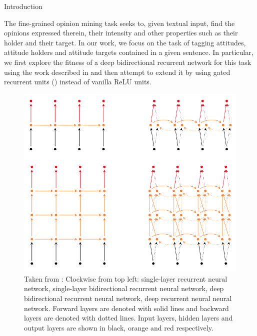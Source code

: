 \documentclass[final]{beamer}
\newlength{\onecolwid}
\begin{document}
\begin{frame}[t]
\begin{columns}[t]
\begin{column}{\onecolwid}
\begin{block}{Introduction}

The fine-grained opinion mining task seeks to, given textual input, find the opinions expressed therein, their intensity and other properties such as their holder and their target. In our work, we focus on the task of tagging attitudes, attitude holders and attitude targets contained in a given sentence. In particular, we first explore the fitness of a deep bidirectional recurrent network for this task using the work described in \cite{irsoy2014opinion} and then attempt to extend it by using gated recurrent units (\cite{DBLP:journals/corr/ChungGCB15}) instead of vanilla ReLU units.

\end{block}


\begin{figure}
\includegraphics[width=0.8\linewidth]{bidrnn-irsoy.png}
\caption{Taken from \cite{irsoy2014opinion}: Clockwise from top left: single-layer recurrent neural network, single-layer bidirectional recurrent neural network, deep bidirectional recurrent neural network, deep recurrent neural neural network. Forward layers are denoted with solid lines and backward layers are denoted with dotted lines. Input layers, hidden layers and output layers are shown in black, orange and red respectively.}
\label{bidrnn-fig}
\end{figure}


\end{column} %


\end{columns}
\end{frame}
\end{document}
